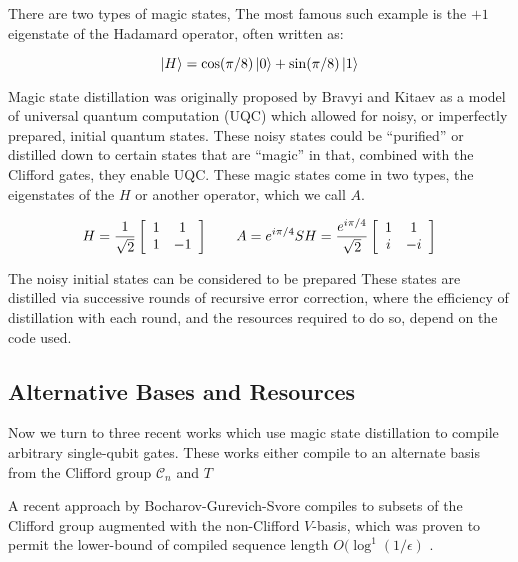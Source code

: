 There are two types of magic states, 
The most famous such example is the $+1$ eigenstate of the Hadamard operator,
often written as:

\begin{equation}
\left\vert{H}\right\rangle = \cos(\pi/8)\left\vert{0}\right\rangle + \sin(\pi/8)\left\vert{1}\right\rangle
\end{equation}

Magic state distillation was originally proposed by Bravyi and Kitaev
\cite{Bravyi2005} as a model of universal quantum computation (UQC) which
allowed for noisy, or imperfectly prepared, initial quantum states. These
noisy states could be ``purified'' or distilled down to certain states
that are ``magic'' in that, combined with the Clifford gates, they enable
UQC. These magic states come in two types, the eigenstates
of the $H$ or another operator, which we call $A$.

\begin{equation}
H = 
\frac{1}{\sqrt{2}}
\left[ \begin{array}{cc}
1 & 1\\
1 & -1
\end{array} \right]
\qquad
A = e^{i\pi / 4} SH = \frac{e^{i\pi/4}}{\sqrt{2}}
\left[ \begin{array}{cc}
1 & 1\\
i & -i
\end{array} \right]
\label{eqn:T}
\end{equation}

The noisy initial states can be considered to be prepared
These states are distilled via successive rounds of recursive error
correction, where the efficiency of distillation with each round,
and the resources required to do so, depend on the code used.


\subsection{Alternative Bases and Resources}

Now we turn to three recent works which use magic state distillation to compile
arbitrary single-qubit gates. These works either compile to an alternate
basis from the Clifford group $\mathcal{C}_n$ and $T$

A recent approach by Bocharov-Gurevich-Svore \cite{Bocharov2013}
compiles to subsets of the Clifford group augmented with the non-Clifford
$V$-basis, which was proven to permit the lower-bound of compiled sequence length
$O(\log^1(1/\epsilon)$
\cite{Harrow2003}.


